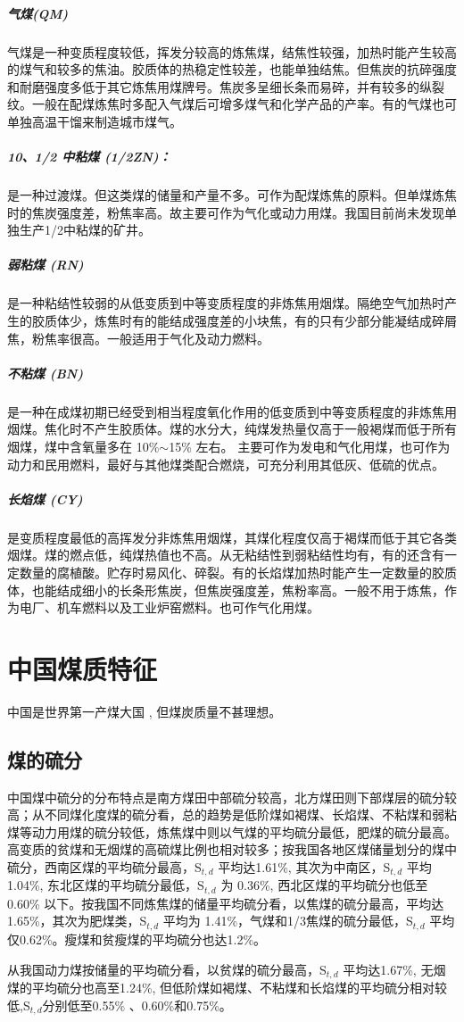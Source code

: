 \documentclass[10pt,openany]{ctexbook}
\begin{document}
\subparagraph{气煤(QM)} 气煤是一种变质程度较低，挥发分较高的炼焦煤，结焦性较强，加热时能产生较高的煤气和较多的焦油。胶质体的热稳定性较差，也能单独结焦。但焦炭的抗碎强度和耐磨强度多低于其它炼焦用煤牌号。焦炭多呈细长条而易碎，并有较多的纵裂纹。一般在配煤炼焦时多配入气煤后可增多煤气和化学产品的产率。有的气煤也可单独高温干馏来制造城市煤气。
\subparagraph{10、1/2 中粘煤 (1/2ZN)：} 是一种过渡煤。但这类煤的储量和产量不多。可作为配煤炼焦的原料。但单煤炼焦时的焦炭强度差，粉焦率高。故主要可作为气化或动力用煤。我国目前尚未发现单独生产1/2中粘煤的矿井。
\subparagraph{弱粘煤 (RN)} 是一种粘结性较弱的从低变质到中等变质程度的非炼焦用烟煤。隔绝空气加热时产生的胶质体少，炼焦时有的能结成强度差的小块焦，有的只有少部分能凝结成碎屑焦，粉焦率很高。一般适用于气化及动力燃料。
\subparagraph{不粘煤 (BN)} 是一种在成煤初期已经受到相当程度氧化作用的低变质到中等变质程度的非炼焦用烟煤。焦化时不产生胶质体。煤的水分大，纯煤发热量仅高于一般褐煤而低于所有烟煤，煤中含氧量多在 10\%$\sim$15\% 左右。 主要可作为发电和气化用煤，也可作为动力和民用燃料，最好与其他煤类配合燃烧，可充分利用其低灰、低硫的优点。
\subparagraph{长焰煤 (CY)} 是变质程度最低的高挥发分非炼焦用烟煤，其煤化程度仅高于褐煤而低于其它各类烟煤。煤的燃点低，纯煤热值也不高。从无粘结性到弱粘结性均有，有的还含有一定数量的腐植酸。贮存时易风化、碎裂。有的长焰煤加热时能产生一定数量的胶质体，也能结成细小的长条形焦炭，但焦炭强度差，焦粉率高。一般不用于炼焦，作为电厂、机车燃料以及工业炉窑燃料。也可作气化用煤。
\section{中国煤质特征}
中国是世界第一产煤大国 , 但煤炭质量不甚理想。
\subsection{煤的硫分 } 中国煤中硫分的分布特点是南方煤田中部硫分较高，北方煤田则下部煤层的硫分较高；从不同煤化度煤的硫分看，总的趋势是低阶煤如褐煤、长焰煤、不粘煤和弱粘煤等动力用煤的硫分较低，炼焦煤中则以气煤的平均硫分最低，肥煤的硫分最高。高变质的贫煤和无烟煤的高硫煤比例也相对较多；按我国各地区煤储量划分的煤中硫分，西南区煤的平均硫分最高，S$_{t,d}$ 平均达1.61\%, 其次为中南区，S$_{t,d}$ 平均 1.04\%, 东北区煤的平均硫分最低，S$_{t,d}$ 为 0.36\%, 西北区煤的平均硫分也低至0.60\% 以下。按我国不同炼焦煤的储量平均硫分看，以焦煤的硫分最高，平均达1.65\%，其次为肥煤类，S$_{t,d}$ 平均为 1.41\%，气煤和1/3焦煤的硫分最低，S$_{t,d}$ 平均仅0.62\%。瘦煤和贫瘦煤的平均硫分也达1.2\%。 \par
从我国动力煤按储量的平均硫分看，以贫煤的硫分最高，S$_{t,d}$ 平均达1.67\%, 无烟煤的平均硫分也高至1.24\%, 但低阶煤如褐煤、不粘煤和长焰煤的平均硫分相对较低,S$_{t,d}$分别低至0.55\% 、0.60\%和0.75\%。
\end{document}

